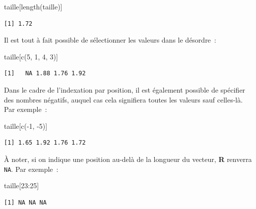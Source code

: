 \documentclass[
  letterpaper,
  DIV=11,
  numbers=noendperiod,
  oneside]{scrreprt}
\newenvironment{Shaded}{\begin{snugshade}}{\end{snugshade}}
\newcommand{\DecValTok}[1]{\textcolor[rgb]{0.68,0.00,0.00}{#1}}
\newcommand{\FunctionTok}[1]{\textcolor[rgb]{0.28,0.35,0.67}{#1}}
\newcommand{\NormalTok}[1]{\textcolor[rgb]{0.00,0.23,0.31}{#1}}
\newcommand{\SpecialCharTok}[1]{\textcolor[rgb]{0.37,0.37,0.37}{#1}}
\begin{document}
\begin{Shaded}
\begin{Highlighting}[]
\NormalTok{taille[}\FunctionTok{length}\NormalTok{(taille)]}
\end{Highlighting}
\end{Shaded}

\begin{verbatim}
[1] 1.72
\end{verbatim}

Il est tout à fait possible de sélectionner les valeurs dans le
désordre~:

\begin{Shaded}
\begin{Highlighting}[]
\NormalTok{taille[}\FunctionTok{c}\NormalTok{(}\DecValTok{5}\NormalTok{, }\DecValTok{1}\NormalTok{, }\DecValTok{4}\NormalTok{, }\DecValTok{3}\NormalTok{)]}
\end{Highlighting}
\end{Shaded}

\begin{verbatim}
[1]   NA 1.88 1.76 1.92
\end{verbatim}

Dans le cadre de l'indexation par position, il est également possible de
spécifier des nombres négatifs, auquel cas cela signifiera toutes les
valeurs sauf celles-là. Par exemple~:

\begin{Shaded}
\begin{Highlighting}[]
\NormalTok{taille[}\FunctionTok{c}\NormalTok{(}\SpecialCharTok{{-}}\DecValTok{1}\NormalTok{, }\SpecialCharTok{{-}}\DecValTok{5}\NormalTok{)]}
\end{Highlighting}
\end{Shaded}

\begin{verbatim}
[1] 1.65 1.92 1.76 1.72
\end{verbatim}

À noter, si on indique une position au-delà de la longueur du vecteur,
\textbf{R} renverra \texttt{NA}. Par exemple~:

\begin{Shaded}
\begin{Highlighting}[]
\NormalTok{taille[}\DecValTok{23}\SpecialCharTok{:}\DecValTok{25}\NormalTok{]}
\end{Highlighting}
\end{Shaded}

\begin{verbatim}
[1] NA NA NA
\end{verbatim}
\end{document}
